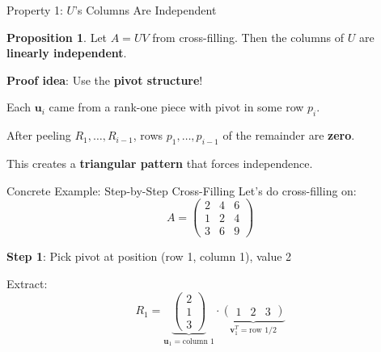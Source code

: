 \documentclass[10pt]{beamer}
\theoremstyle{definition}
\newtheorem{prop}{Proposition}[section]
\newcommand{\x}[1]{\alert{\textbf{#1}}}
\begin{document}
\begin{frame}{Property 1: $U$'s Columns Are Independent}
\begin{prop}
Let $A = UV$ from cross-filling. Then the columns of $U$ are \x{linearly independent}.
\end{prop}

\vfill
\textbf{Proof idea}: Use the \x{pivot structure}!

Each $\mathbf{u}_i$ came from a rank-one piece with pivot in some row $p_i$.

After peeling $R_1, \ldots, R_{i-1}$, rows $p_1, \ldots, p_{i-1}$ of the remainder are \x{zero}.

This creates a \x{triangular pattern} that forces independence.
\end{frame}

\begin{frame}[fragile]{Concrete Example: Step-by-Step Cross-Filling}
Let's do cross-filling on:
$$A = \begin{pmatrix} 2 & 4 & 6 \\ 1 & 2 & 4 \\ 3 & 6 & 9 \end{pmatrix}$$

\vfill
\textbf{Step 1}: Pick pivot at position (row 1, column 1), value 2

\begin{center}
\end{center}

\vfill
Extract:
$$R_1 = \underbrace{\begin{pmatrix} 2 \\ 1 \\ 3 \end{pmatrix}}_{\mathbf{u}_1 = \text{column 1}} \cdot \underbrace{\begin{pmatrix} 1 & 2 & 3 \end{pmatrix}}_{\mathbf{v}_1^T = \text{row 1}/2}$$
\end{frame}
\end{document}
